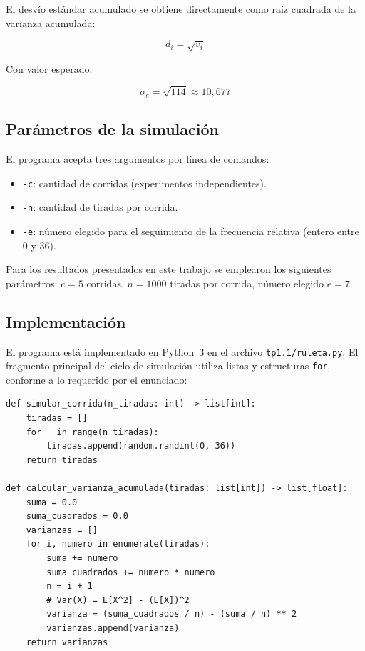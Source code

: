 \documentclass[a4paper, 11pt]{article}
\begin{document}
El desvío estándar acumulado se obtiene directamente como raíz cuadrada de la
varianza acumulada:

\begin{equation}
  d_i = \sqrt{v_i}
  \label{eq:desvio}
\end{equation}

Con valor esperado:

\begin{equation}
  \sigma_e = \sqrt{114} \approx 10{,}677
  \label{eq:desvio_esperado}
\end{equation}

\subsection{Parámetros de la simulación}

El programa acepta tres argumentos por línea de comandos:

\begin{itemize}
  \item \texttt{-c}: cantidad de corridas (experimentos independientes).
  \item \texttt{-n}: cantidad de tiradas por corrida.
  \item \texttt{-e}: número elegido para el seguimiento de la frecuencia
        relativa (entero entre 0 y 36).
\end{itemize}

Para los resultados presentados en este trabajo se emplearon los siguientes
parámetros: $c = 5$ corridas, $n = 1000$ tiradas por corrida, número
elegido $e = 7$.

\subsection{Implementación}

El programa está implementado en Python~3 en el archivo \texttt{tp1.1/ruleta.py}.
El fragmento principal del ciclo de simulación utiliza listas y estructuras
\texttt{for}, conforme a lo requerido por el enunciado:

\begin{lstlisting}[style=python, caption={Simulación de una corrida con cómputo de varianza acumulada (fórmula online).}]
def simular_corrida(n_tiradas: int) -> list[int]:
    tiradas = []
    for _ in range(n_tiradas):
        tiradas.append(random.randint(0, 36))
    return tiradas

def calcular_varianza_acumulada(tiradas: list[int]) -> list[float]:
    suma = 0.0
    suma_cuadrados = 0.0
    varianzas = []
    for i, numero in enumerate(tiradas):
        suma += numero
        suma_cuadrados += numero * numero
        n = i + 1
        # Var(X) = E[X^2] - (E[X])^2
        varianza = (suma_cuadrados / n) - (suma / n) ** 2
        varianzas.append(varianza)
    return varianzas
\end{lstlisting}
\end{document}

